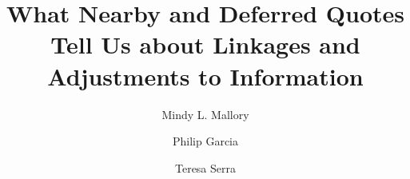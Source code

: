 \documentclass{elsarticle}
\title{What Nearby and Deferred Quotes Tell Us about Linkages and Adjustments
to Information}
\author[ill]{Mindy L. Mallory\corref{cor1}}
\author[ill]{Philip Garcia\fnref{fn1}}
\author[ill]{Teresa Serra}
\begin{document}
 
\begin{titlepage}
\maketitle
\end{titlepage}
\end{document}
